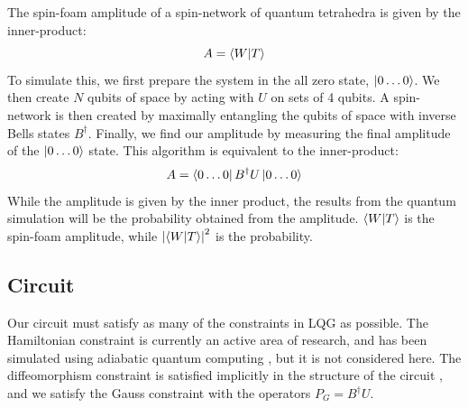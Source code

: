 \documentclass[a4paper,11pt,aps,tightenlines,nofootinbib]{revtex4}
\begin{document}
        The spin-foam amplitude of a spin-network of quantum tetrahedra is given by the inner-product: %
        \begin{equation}
                A = \bra{W}\ket{T}
        \end{equation}
        To simulate this, we first prepare the system in the all zero state, $\ket{0\dots 0}$. We then create $N$ qubits of space by acting with $U$ on sets of 4 qubits.
        A spin-network is then created by maximally entangling the qubits of space with inverse Bells states $B^\dagger$. Finally, we find our amplitude by measuring the 
        final amplitude of the $\ket{0\dots0} $ state. This algorithm is equivalent to the inner-product:
        \begin{equation}
                A = \bra{0\dots0}B^\dagger U\ket{0\dots0}
        \end{equation}
        While the amplitude is given by the inner product, the results from the quantum simulation will be the probability obtained from the amplitude. $\bra{W}\ket{T}$ is the spin-foam 
        amplitude, while $\abs{\bra{W}\ket{T}}^2$ is the probability. 

\subsection{Circuit}
        Our circuit must satisfy as many of the constraints in LQG as possible. The Hamiltonian constraint is currently an active area of research,
        and has been simulated using adiabatic quantum computing \cite{adiabatic}, but it is not considered here. The diffeomorphism constraint is satisfied implicitly in 
        the structure of the circuit \cite{ibm-qsim-qubit-of-space}, and we satisfy the Gauss constraint with the operators $P_G = B^\dagger U$.
\end{document}
